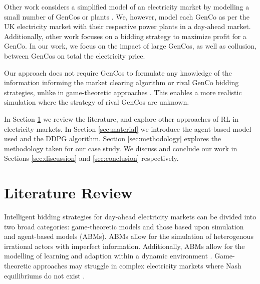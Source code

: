 \documentclass[conference]{IEEEtran}
\begin{document}
Other work considers a simplified model of an electricity market by modelling a small number of GenCos or plants \cite{EsmaeiliAliabadi2017,Tellidou2007}. We, however, model each GenCo as per the UK electricity market with their respective power plants in a day-ahead market. Additionally, other work focuses on a bidding strategy to maximize profit for a GenCo. In our work, we focus on the impact of large GenCos, as well as collusion, between GenCos on total the electricity price. 


Our approach does not require GenCos to formulate any knowledge of the information informing the market clearing algorithm or rival GenCo bidding strategies, unlike in game-theoretic approaches \cite{Wang2011}. This enables a more realistic simulation where the strategy of rival GenCos are unknown.

In Section \ref{sec:lit-review} we review the literature, and explore other approaches of RL in electricity markets. In Section \ref{sec:material} we introduce the agent-based model used and the DDPG algorithm. Section \ref{sec:methodology} explores the methodology taken for our case study. We discuss and conclude our work in Sections \ref{sec:discussion} and \ref{sec:conclusion} respectively. 














\section{Literature Review}
\label{sec:lit-review}

Intelligent bidding strategies for day-ahead electricity markets can be divided into two broad categories: game-theoretic models and those based upon simulation and agent-based models (ABMs). ABMs allow for the simulation of heterogenous irrational actors with imperfect information. Additionally, ABMs allow for the modelling of learning and adaption within a dynamic environment \cite{EsmaeiliAliabadi2017}. Game-theoretic approaches may struggle in complex electricity markets where Nash equilibriums do not exist \cite{Wang2011}.
\end{document}
